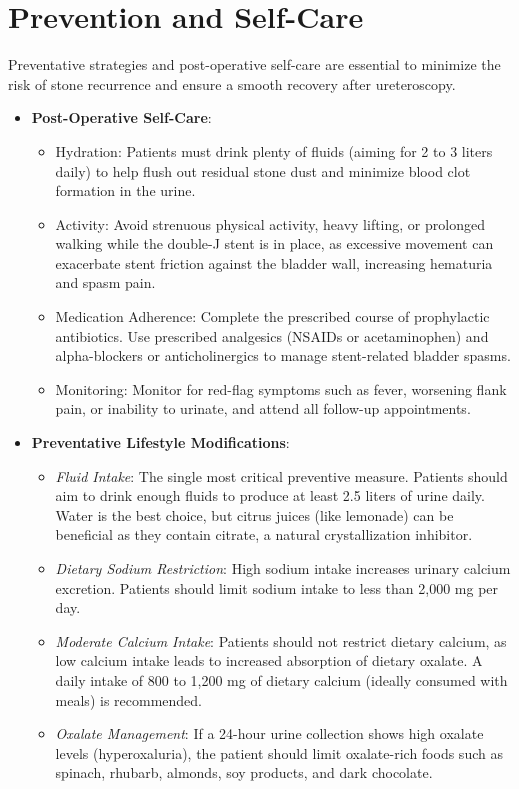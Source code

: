 \section*{Prevention and Self-Care}
Preventative strategies and post-operative self-care are essential to minimize the risk of stone recurrence and ensure a smooth recovery after ureteroscopy.
\begin{itemize}
\item \textbf{Post-Operative Self-Care}:
  \begin{itemize}
  \item Hydration: Patients must drink plenty of fluids (aiming for 2 to 3 liters daily) to help flush out residual stone dust and minimize blood clot formation in the urine.
  \item Activity: Avoid strenuous physical activity, heavy lifting, or prolonged walking while the double-J stent is in place, as excessive movement can exacerbate stent friction against the bladder wall, increasing hematuria and spasm pain.
  \item Medication Adherence: Complete the prescribed course of prophylactic antibiotics. Use prescribed analgesics (NSAIDs or acetaminophen) and alpha-blockers or anticholinergics to manage stent-related bladder spasms.
  \item Monitoring: Monitor for red-flag symptoms such as fever, worsening flank pain, or inability to urinate, and attend all follow-up appointments.
  \end{itemize}
\item \textbf{Preventative Lifestyle Modifications}:
  \begin{itemize}
  \item \textit{Fluid Intake}: The single most critical preventive measure. Patients should aim to drink enough fluids to produce at least 2.5 liters of urine daily. Water is the best choice, but citrus juices (like lemonade) can be beneficial as they contain citrate, a natural crystallization inhibitor.
  \item \textit{Dietary Sodium Restriction}: High sodium intake increases urinary calcium excretion. Patients should limit sodium intake to less than 2,000 mg per day.
  \item \textit{Moderate Calcium Intake}: Patients should not restrict dietary calcium, as low calcium intake leads to increased absorption of dietary oxalate. A daily intake of 800 to 1,200 mg of dietary calcium (ideally consumed with meals) is recommended.
  \item \textit{Oxalate Management}: If a 24-hour urine collection shows high oxalate levels (hyperoxaluria), the patient should limit oxalate-rich foods such as spinach, rhubarb, almonds, soy products, and dark chocolate.

\end{itemize}
\end{itemize}
